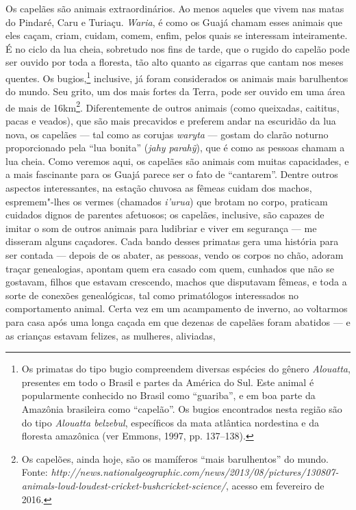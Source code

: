 Os capelães são animais extraordinários. Ao menos aqueles que vivem nas
matas do Pindaré, Caru e Turiaçu. \emph{Waria}, é como os Guajá chamam
esses animais que eles caçam, criam, cuidam, comem, enfim, pelos quais
se interessam inteiramente. É no ciclo da lua cheia, sobretudo nos fins
de tarde, que o rugido do capelão pode ser ouvido por toda a floresta,
tão alto quanto as cigarras que cantam nos meses quentes. Os
bugios,\footnote{Os primatas do tipo bugio compreendem diversas espécies
  do gênero \emph{Alouatta}, presentes em todo o Brasil e partes da
  América do Sul. Este animal é popularmente conhecido no Brasil como
  ``guariba'', e em boa parte da Amazônia brasileira como ``capelão''.
  Os bugios encontrados nesta região são do tipo \emph{Alouatta
  belzebul}, específicos da mata atlântica nordestina e da floresta
  amazônica (ver Emmons, 1997, pp. 137--138).} inclusive, já foram
considerados os animais mais barulhentos do mundo. Seu grito, um dos
mais fortes da Terra, pode ser ouvido em uma área de mais de
16km\footnote{Os capelões, ainda hoje, são os mamíferos ``mais
  barulhentos'' do mundo. Fonte:
  \emph{http://news.nationalgeographic.com/news/2013/08/pictures/130807-animals-loud-loudest-cricket-bushcricket-science/},
  acesso em fevereiro de 2016.}. Diferentemente de outros animais (como
queixadas, caititus, pacas e veados), que são mais precavidos e preferem
andar na escuridão da lua nova, os capelães --- tal como as corujas
\emph{waryta} --- gostam do clarão noturno proporcionado pela ``lua
bonita'' (\emph{jahy parahỹ}), que é como as pessoas chamam a lua cheia.
Como veremos aqui, os capelães são animais com muitas capacidades, e a
mais fascinante para os Guajá parece ser o fato de ``cantarem''. Dentre
outros aspectos interessantes, na estação chuvosa as fêmeas cuidam dos
machos, espremem"-lhes os vermes (chamados \emph{i'urua}) que brotam no
corpo, praticam cuidados dignos de parentes afetuosos; os capelães,
inclusive, são capazes de imitar o som de outros animais para ludibriar
e viver em segurança --- me disseram alguns caçadores. Cada bando desses
primatas gera uma história para ser contada --- depois de os abater, as
pessoas, vendo os corpos no chão, adoram traçar genealogias, apontam
quem era casado com quem, cunhados que não se gostavam, filhos que
estavam crescendo, machos que disputavam fêmeas, e toda a sorte de
conexões genealógicas, tal como primatólogos interessados no
comportamento animal. Certa vez em um acampamento de inverno, ao
voltarmos para casa após uma longa caçada em que dezenas de capelães
foram abatidos --- e as crianças estavam felizes, as mulheres, aliviadas,
